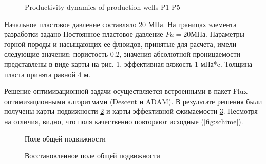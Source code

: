 \documentclass{article}
\begin{document}
\begin{figure}
	\caption{Productivity dynamics of production wells P1-P5}
	\label{fig:prod_rate}
\end{figure}


 Начальное пластовое давление составляло 20 МПа. На границах элемента разработки задано Постоянное пластовое давление $Pa = 20 МПа$. Параметры горной породы и насыщающих ее флюидов, принятые для расчета, имели следующие значения: пористость 0.2, значения абсолютной проницаемости представлены в виде карты на рис. 1, эффективная вязкость 1 мПа*c. Толщина пласта принята равной 4 м.

Решение оптимизационной задачи осуществляется встроенными в пакет Flux оптимизационными алгоритмами (Descent и ADAM). В результате решения были получены карты подвижности \ref{fig:mob} и карты эффективной сжимаемости \ref{comp}. Несмотря на отличия, видно, что поля качественно повторяют исходные (\ref{fig:schime}).
\begin{figure}
	\caption{Поле общей подвижности}
	\label{fig:mob}
\end{figure}
\begin{figure}
	\caption{Восстановленное поле общей подвижности}
	\label{comp}
\end{figure}
\end{document}
